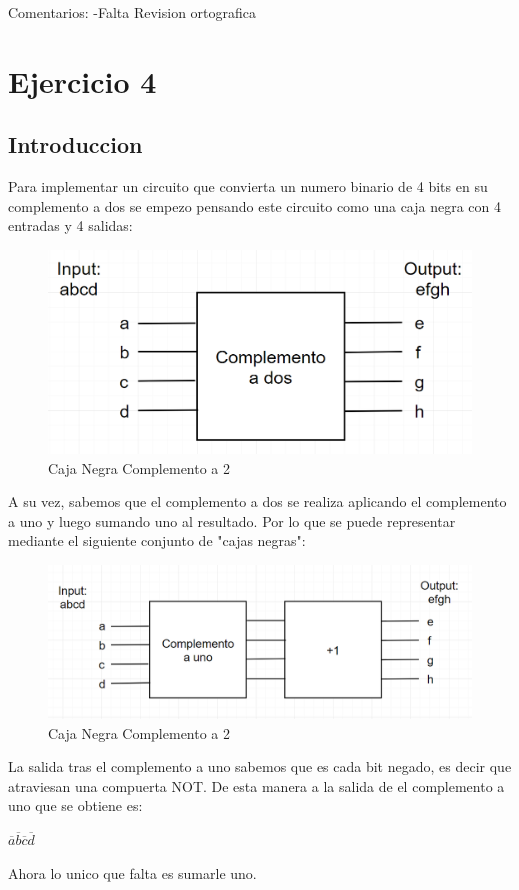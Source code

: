 \documentclass{article}
\begin{document}
	
	Comentarios:
	\newline -Falta Revision ortografica
	\section{Ejercicio 4}
	\subsection{Introduccion}
		\hspace{10mm} Para implementar un circuito que convierta un numero binario de 4 bits en su complemento a dos se empezo pensando este circuito como una caja negra con 4 entradas y 4 salidas:
		\begin{figure}[h!]
			\includegraphics[width=\linewidth,scale=0.5]{comp2.png}
  			\caption{Caja Negra Complemento a 2}
		\end{figure}
		\newline \hspace{10mm} A su vez, sabemos que el complemento a dos se realiza aplicando el complemento a uno y luego sumando uno al resultado. Por lo que se puede representar mediante el siguiente conjunto de "cajas negras":
		\begin{figure}[h!]
			\includegraphics[width=\linewidth,scale=0.5]{comp1+1.png}
  			\caption{Caja Negra Complemento a 2}
		\end{figure}
		\newline \hspace{10mm} La salida tras el complemento a uno sabemos que es cada bit negado, es decir que atraviesan una compuerta NOT. De esta manera a la salida de el complemento a uno que se obtiene es: 
		\newline \centerline{$\overline{a} \overline{b} \overline{c} \overline{d}$} 
		\hspace{10mm} Ahora lo unico que falta es sumarle uno.
\end{document}
